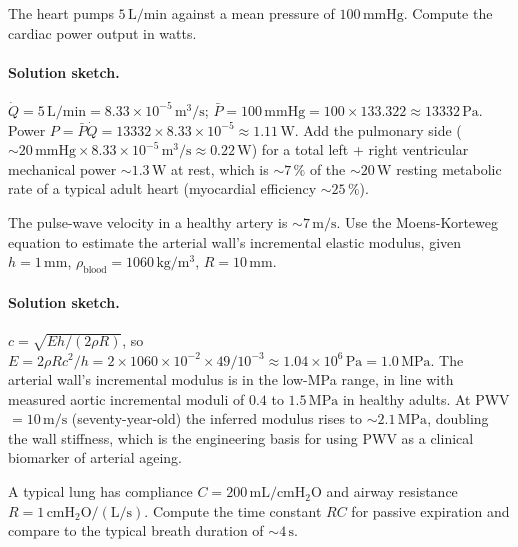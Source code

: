 \begin{exercise}
The heart pumps $5\,\text{L}/\text{min}$ against a mean pressure of
$100\,\text{mmHg}$. Compute the cardiac power output in watts.
\end{exercise}

\paragraph{Solution sketch.}
$\dot Q = 5\,\text{L/min} = 8.33 \times 10^{-5}\,\text{m}^3/\text{s}$;
$\bar P = 100\,\text{mmHg} = 100 \times 133.322 \approx 13332\,\text{Pa}$.
Power $P = \bar P \dot Q = 13332 \times 8.33 \times 10^{-5}
\approx 1.11\,\text{W}$. Add the pulmonary side
($\sim 20\,\text{mmHg} \times 8.33\times 10^{-5}\,\text{m}^3/\text{s}
\approx 0.22\,\text{W}$) for a total left + right ventricular
mechanical power $\sim 1.3\,\text{W}$ at rest, which is $\sim 7\,\%$
of the $\sim 20\,\text{W}$ resting metabolic rate of a typical adult
heart (myocardial efficiency $\sim 25\,\%$).

\begin{exercise}
The pulse-wave velocity in a healthy artery is $\sim 7\,\text{m}/\text{s}$.
Use the Moens-Korteweg equation to estimate the arterial wall's
incremental elastic modulus, given $h = 1\,\text{mm}$,
$\rho_{\text{blood}} = 1060\,\text{kg}/\text{m}^3$, $R = 10\,\text{mm}$.
\end{exercise}

\paragraph{Solution sketch.}
$c = \sqrt{E h / (2 \rho R)}$, so
$E = 2 \rho R c^2 / h
   = 2 \times 1060 \times 10^{-2} \times 49 / 10^{-3}
   \approx 1.04 \times 10^{6}\,\text{Pa}
   = 1.0\,\text{MPa}$.
The arterial wall's incremental modulus is in the low-MPa range, in
line with measured aortic incremental moduli of $0.4$ to $1.5\,\text{MPa}$
in healthy adults. At PWV $= 10\,\text{m/s}$ (seventy-year-old) the
inferred modulus rises to $\sim 2.1\,\text{MPa}$, doubling the wall
stiffness, which is the engineering basis for using PWV as a
clinical biomarker of arterial ageing.

\begin{exercise}
A typical lung has compliance $C = 200\,\text{mL}/\text{cmH}_2\text{O}$
and airway resistance $R = 1\,\text{cmH}_2\text{O}/(\text{L}/\text{s})$.
Compute the time constant $RC$ for passive expiration and compare to
the typical breath duration of $\sim 4\,\text{s}$.
\end{exercise}


